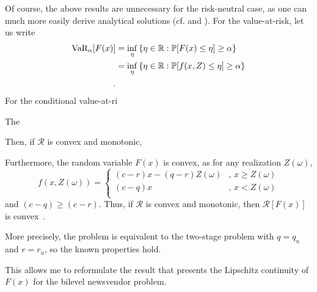 \documentclass[12pt]{article}
\begin{document}
Of course, the above results are unnecessary for the risk-neutral case, as one can much more easily derive analytical solutions (cf. \citet[Chapter~1.e]{birgeIntroductionStochasticProgramming2011} and \citet[Chapter~1.2.1]{shapiroLecturesStochasticProgramming2009}).
For the value-at-risk, let us write
\begin{align*}
    \text{VaR}_{\alpha}[F(x)] &= \inf_{\eta}\left\{ \eta \in \mathbb{R} : \mathbb{P}[ F(x) \le \eta] \ge \alpha  \right\} \\
    &= \inf_{\eta}\left\{ \eta \in \mathbb{R} : \mathbb{P}[ f(x,Z) \le \eta] \ge \alpha  \right\} \\
.\end{align*} 
For the conditional value-at-ri

The 

Then, if $\mathcal{R}$ is convex and monotonic, 

Furthermore, the random variable $F(x)$ is convex, as for any realization $Z(\omega)$, \[
    f(x,Z(\omega)) = \begin{cases}
	(c-r)x - (q-r)Z(\omega) &,\, x \ge Z(\omega) \\
	(c-q)x &,\, x < Z(\omega) \\
    \end{cases}
\] and $(c-q) \ge (c-r)$.
Thus, if $\mathcal{R}$ is convex and monotonic, then $\mathcal{R}[F(x)]$ is convex~\citep[Proposition~6.8]{shapiroLecturesStochasticProgramming2009}.

More precisely, the problem is equivalent to the two-stage problem with $q=q_u$ and $r=r_u$, so the known properties hold.



This allows me to reformulate the result that presents the Lipschitz continuity of $F(x)$ for the bilevel newsvendor problem.
\end{document}
